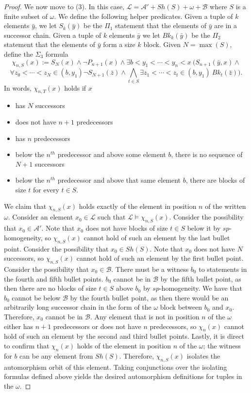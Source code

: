 \documentclass[11pt]{amsart}
\theoremstyle{definition}
\def\A{\mathcal A}
\def\B{\mathcal{B}}
\def\L{\mathcal L}
\begin{document}
\begin{proof}
    We now move to (3).
    In this case, $\L=\A'+Sh(S)+\omega+\B$ where $S$ is a finite subset of $\omega$.
    We define the following helper predicates.
    Given a tuple of $k$ elements $\bar{y}$, we let $S_k(\bar{y})$ be the $\Pi_1$ statement that the elements of $\bar{y}$ are in a successor chain.
    Given a tuple of $k$ elements $\bar{y}$ we let $Bk_k(\bar{y})$ be the $\Pi_2$ statement that the elements of $\bar{y}$ form a size $k$ block.
    Given $N=\max(S)$, define the $\Sigma_3$ formula
    \[\chi_{n,S}(x):=S_N(x)\land \lnot P_{n+1}(x) \land \exists b<y_1<\cdots<y_n<x ~ \Big(S_{n+1}(\bar{y},x)\land  \]
    \[\forall z_0<\cdots<z_N\in(b,y_1)\lnot S_{N+1}(\bar{z})\land\bigwedge_{t\in S}\exists z_1<\cdots<z_t\in(b,y_1)~Bk_t(\bar{z})\Big).\]
    In words, $\chi_{n,T}(x)$ holds if $x$ 
    \begin{itemize}
        \item has $N$ successors
        \item does not have $n+1$ predecessors
        \item has $n$ predecessors
        \item below the $n^{th}$ predecessor and above some element $b$, there is no sequence of $N+1$ successors
        \item below the $n^{th}$ predecessor and above that same element $b$, there are blocks of size $t$ for every $t\in S$.
    \end{itemize}

    We claim that $\chi_{n,S}(x)$ holds exactly of the element in position $n$ of the written $\omega$.
    Consider an element $x_0\in\L$ such that $\L\models\chi_{n,S}(x)$.
    Consider the possibility that $x_0\in\A'$.
    Note that $x_0$ does not have blocks of size $t\in S$ below it by $sp$-homogeneity, so $\chi_{n,S}(x)$ cannot hold of such an element by the last bullet point.
    Consider the possibility that $x_0\in Sh(S)$. Note that $x_0$ does not have $N$ successors, so $\chi_{n,S}(x)$ cannot hold of such an element by the first bullet point.
    Consider the possibility that $x_0\in \B$.
    There must be a witness $b_0$ to statements in the fourth and fifth bullet points.
    $b_0$ cannot be in $\B$ by the fifth bullet point, as then there are no blocks of size $t\in S$ above $b_0$ by $sp$-homogeneity.
    We have that $b_0$ cannot be below $\B$ by the fourth bullet point, as then there would be an arbitrarily long successor chain in the form of the $\omega$ block between $b_0$ and $x_0$.
    Therefore, $x_0$ cannot be in $\B$.
    Any element that is not in position $n$ of the $\omega$ either has $n+1$ predecessors or does not have $n$ predecessors, so $\chi_n(x)$ cannot hold of such an element by the second and third bullet points. 
    Lastly, it is direct to confirm that $\chi_n(x)$ holds of the element in position $n$ of the $\omega$; the witness for $b$ can be any element from $Sh(S)$.
    Therefore, $\chi_{n,S}(x)$ isolates the automorphism orbit of this element.
    Taking conjunctions over the isolating formulas defined above yields the desired automorphism definitions for tuples in the $\omega.$


\end{proof}
\end{document}
